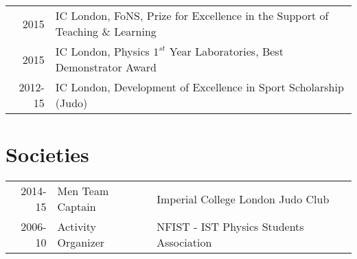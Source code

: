 \documentclass[letterpaper]{deedy-resume} %
\begin{document}
\begin{minipage}[t]{0.66\textwidth}
\begin{tabular}{rl}
2015	  & IC London, FoNS, Prize for Excellence in the Support of Teaching \& Learning \\
2015      & IC London, Physics $1^{st}$ Year Laboratories, Best Demonstrator Award \\
2012-15 & IC London, Development of Excellence in Sport Scholarship (Judo) \\
\end{tabular}

\sectionspace %


\section{Societies} 

\begin{tabular}{rll}
2014-15 & Men Team Captain & Imperial College London Judo Club \\
2006-10 & Activity Organizer & NFIST - IST Physics Students Association \\
\end{tabular}



\end{minipage} %








\end{document}

